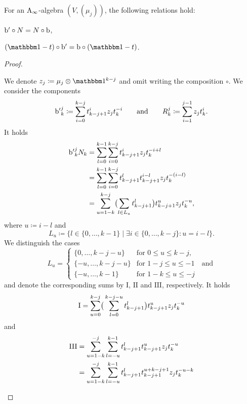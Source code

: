 \documentclass[\MainFolder/Text.tex]{subfiles}
\begin{document}
\begin{Lemma}[CP2] \label{Lem:CP2}
For an $\mathrm{A}_\infty$-algebra $(V,(\mu_j))$, the following relations hold:
\begin{ClaimList}
\item $\mathrm{b}'\circ N = N\circ \mathrm{b}$,
\item $(\Id-\CycPermOp)\circ \Hd' = \Hd\circ (\Id-\CycPermOp)$.
\end{ClaimList}
\end{Lemma}
\begin{proof}
\begin{ProofList}
\item We denote $z_j \coloneqq \mu_j \otimes \Id^{k-j}$ and omit writing the composition $\circ$. We consider the components
$$ {\mathrm{b}'}_k^j \coloneqq \sum_{i=0}^{k-j} t^i_{k-j+1}z_jt_k^{-i} \qquad\text{and}\qquad R_k^j \coloneqq \sum_{i=1}^{j-1} z_jt_k^i. $$
It holds
\begin{align*} 
{\mathrm{b}'}_k^j N_k &= \sum_{l=0}^{k-1}\sum_{i=0}^{k-j} t^i_{k-j+1} z_j t^{-i + l}_k \\
& = \sum_{l=0}^{k-1} \sum_{i=0}^{k-j} t^l_{k-j+1} t^{i-l}_{k-j+1} z_j t^{-(i-l)}_k \\
& = \sum_{u=1-k}^{k-j} \bigl(\sum_{l\in L_u} t^l_{k-j+1}\bigr) t^u_{k-j+1} z_j t^{-u}_k,
\end{align*}
where $u \coloneqq i - l$ and 
$$L_u \coloneqq \{ l\in \{0, \dotsc, k-1\} \mid \exists i\in \{0,\dotsc, k-j\} : u = i-l \}. $$ 
We distinguish the cases
$$ L_u = \begin{cases}
         \{0,\dotsc, k-j-u\} & \text{for }0\le u \le k-j, \\
         \{-u, \dotsc, k-j-u\} & \text{for } 1-j \le u \le -1\quad\text{and} \\
         \{-u, \dotsc, k -1\} & \text{for }1-k \le u \le -j
         \end{cases}$$
and denote the corresponding sums by $\mathrm{I}$, $\mathrm{II}$ and $\mathrm{III}$, respectively. It holds         
$$ \mathrm{I} = \sum_{u=0}^{k-j} \bigr(\sum_{l=0}^{k-j-u} t^l_{k-j+1} \bigl) t^u_{k-j+1} z_j t^{-u}_k $$
and  
\begin{align*}
\mathrm{III} &= \sum_{u = 1- k}^{-j} \sum_{l = -u}^{k-1} \CycPermOp^l_{k-j+1} \CycPermOp^u_{k-j+1} z_j \CycPermOp^{-u}_k \\
& = \sum_{u = 1- k}^{-j} \sum_{l = -u}^{k-1} \CycPermOp^l_{k-j+1} \CycPermOp^{u+k-j+1}_{k-j+1} z_j \CycPermOp^{-u-k}_k  \\

\end{align*}
\end{ProofList}
\end{proof}
\end{document}
